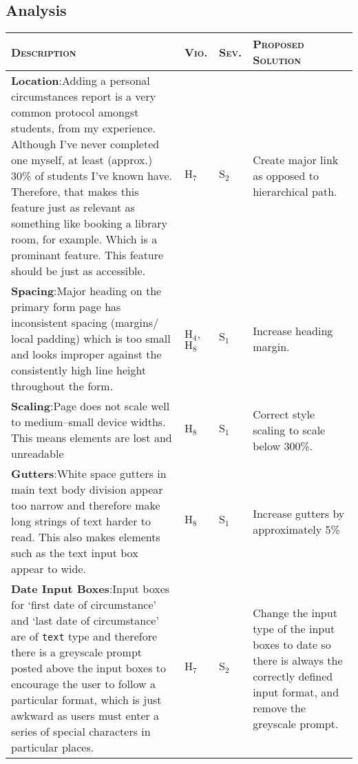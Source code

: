\documentclass[11pt, english]{article}
\begin{document}
\newpage

	\subsection{Analysis}

	\begin{center}
		\scriptsize
	\begin{longtable}{p{7.5cm}p{0.5cm}p{0.5cm}p{4cm}}
		\textsc{Description} & \textsc{Vio.} & \textsc{Sev.} & \textsc{Proposed Solution}\\
		\hline
		\textbf{Location}:\newline Adding a personal circumstances report is a very common protocol amongst students, from my experience. Although I've never completed one myself, at least (approx.) 30\% of students I've known have. Therefore, that makes this feature just as relevant as something like booking a library room, for example. Which is a prominant feature. This feature should be just as accessible. & $\mathrm{H_{7}}$ & $\mathrm{S_{2}}$ & Create major link as opposed to hierarchical path.\\
		\textbf{Spacing}:\newline Major heading on the primary form page has inconsistent spacing (margins/ local padding) which is too small and looks improper against the consistently high line height throughout the form. & $\mathrm{H_{4}}$, $\mathrm{H_{8}}$ & $\mathrm{S_{1}}$ & Increase heading margin.\\
		\textbf{Scaling}:\newline Page does not scale well to medium--small device widths. This means elements are lost and unreadable & $\mathrm{H_{8}}$ & $\mathrm{S_{1}}$ & Correct style scaling to scale below 300\%.\\
		\textbf{Gutters}:\newline White space gutters in main text body division appear too narrow and therefore make long strings of text harder to read. This also makes elements such as the text input box appear to wide. & $\mathrm{H_{8}}$ & $\mathrm{S_{1}}$ & Increase gutters by approximately 5\%\\
		\textbf{Date Input Boxes}:\newline Input boxes for `first date of circumstance' and `last date of circumstance' are of \verb|text| type and therefore there is a greyscale prompt posted above the input boxes to encourage the user to follow a particular format, which is just awkward as users must enter a series of special characters in particular places. & $\mathrm{H_{7}}$ & $\mathrm{S_{2}}$ & Change the input type of the input boxes to date so there is always the correctly defined input format, and remove the greyscale prompt.\\

\end{longtable}
\end{center}
\end{document}
